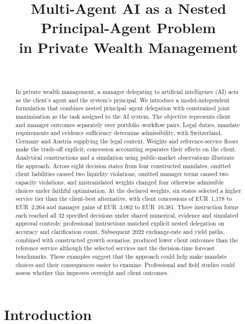 \documentclass[oneside,10pt,english]{swissi}
\title{Multi-Agent AI as a Nested Principal-Agent Problem\\in Private Wealth Management \\[0.35em]
\normalsize \papersubtitle}
\author{{\fontsize{8}{10}\selectfont\paperauthors}\\[0.9em]
{\scriptsize\paperaffiliations}}
\date{\vspace{1.5em}}
\begin{document}
\maketitle
\begin{abstract}
In private wealth management, a manager delegating to artificial intelligence (AI) acts as the client's agent and the system's principal. We introduce a model-independent formulation that combines nested principal--agent delegation with constrained joint maximisation as the task assigned to the AI system. The objective represents client and manager outcomes separately over portfolio--workflow pairs. Legal duties, mandate requirements and evidence sufficiency determine admissibility, with Switzerland, Germany and Austria supplying the legal context. Weights and reference-service floors make the trade-off explicit; concession accounting separates their effects on the client. Analytical constructions and a simulation using public-market observations illustrate the approach. Across eight decision states from four constructed mandates, omitted client liabilities caused two liquidity violations, omitted manager terms caused two capacity violations, and mistranslated weights changed four otherwise admissible choices under faithful optimisation. At the declared weights, six states selected a higher service tier than the client-best alternative, with client concessions of EUR~1,178 to EUR~2,264 and manager gains of EUR~3,062 to EUR~10,381. Three instruction forms each reached all 32 specified decisions under shared numerical, evidence and simulated approval controls; professional instructions matched explicit nested delegation on accuracy and clarification count. Subsequent 2022 exchange-rate and yield paths, combined with constructed growth scenarios, produced lower client outcomes than the reference service although the selected services met the decision-time forecast benchmarks. These examples suggest that the approach could help make mandate choices and their consequences easier to examine. Professional and field studies could assess whether this improves oversight and client outcomes.

\end{abstract}


\section{Introduction}\label{sec:introduction}
\end{document}
